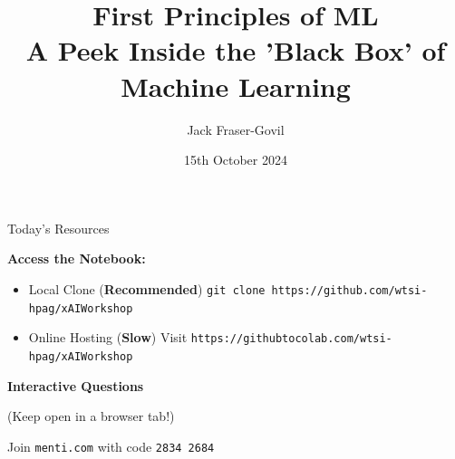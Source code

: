 \documentclass[]{SangerLibrary/sanger-present}
\title{\LARGE First Principles of ML\\ {\footnotesize A Peek Inside the 'Black Box' of Machine Learning}}
\author{\large Jack Fraser-Govil}
\institute{The Wellcome Sanger Institute, Hinxton, UK}
\date{\small 15th October 2024}
\begin{document}
	\begin{frame}[fragile]{Today's Resources}
		
		{\large 
		\textbf{Access the Notebook:} 
		\begin{itemize}
			\item Local Clone (\textbf{Recommended}) \verb|git clone https://github.com/wtsi-hpag/xAIWorkshop|
			\item Online Hosting (\textbf{Slow}) Visit \verb|https://githubtocolab.com/wtsi-hpag/xAIWorkshop|
		\end{itemize}
	
		\vspace{1cm}

		\textbf{Interactive Questions} 
		
		(Keep open in a browser tab!)

		\begin{center}
			Join \verb|menti.com| with code \verb|2834 2684|
		\end{center}
		}
	\end{frame}

	\maketitlepage
\end{document}
